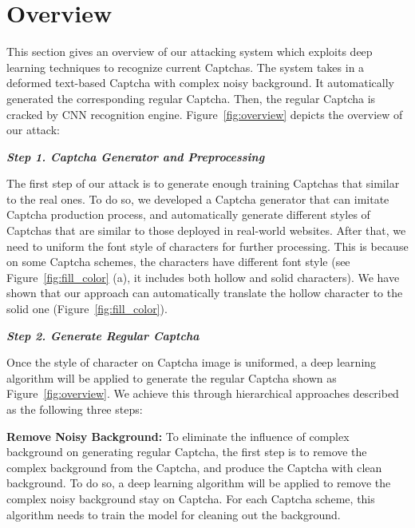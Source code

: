 \section{Overview}

This section gives an overview of our attacking system which exploits deep learning techniques to recognize current Captchas. The system takes in a deformed text-based Captcha with complex noisy background. It automatically generated the corresponding regular Captcha. Then, the regular Captcha is cracked by CNN recognition engine. Figure~\ref{fig:overview} depicts the overview of our attack:

\noindent \textbf{\emph{Step 1. Captcha Generator and Preprocessing}}

The first step of our attack is to generate enough training Captchas that similar to the real ones. To do so, we developed a Captcha generator that can imitate Captcha production process, and automatically generate different styles of Captchas that are similar to those deployed in real-world websites. After that, we need to uniform the font style of characters for further processing. This is because on some Captcha schemes, the characters have different font style (see Figure~\ref{fig:fill_color} (a), it includes both hollow and solid characters). We have shown that our approach can automatically translate the hollow character to the solid one (Figure~\ref{fig:fill_color}).


\noindent \textbf{\emph{Step 2. Generate Regular Captcha}}

Once the style of character on Captcha image is uniformed, a deep learning algorithm will be applied to generate the regular Captcha shown as Figure~\ref{fig:overview}. We achieve this through hierarchical approaches described as the following three steps:

\noindent \circling{\textcolor{white}{1}} \textbf{Remove Noisy Background:}  To eliminate the influence of complex background on generating regular Captcha, the first step is to remove the complex background from the Captcha, and produce the Captcha with clean background.
To do so, a deep learning algorithm will be applied to remove the complex noisy background stay on Captcha.
For each Captcha scheme, this algorithm needs to train the model for cleaning out the background.

